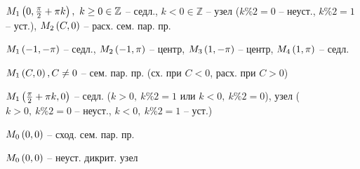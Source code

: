 \begin{enumsols}
		\label{sol:stability_points:types_general}
		\item \( M_1 \left( 0, \frac{\pi}{2} + \pi k \right), ~ k \ge 0 \in \mathbb{Z} \) -- седл., \( k < 0 \in \mathbb{Z} \) -- узел ($k \% 2 = 0$ -- неуст., $k \% 2 = 1$ -- уст.), \( M_2 \left( C, 0 \right) \) -- расх. сем. пар. пр. %
		\item \( M_1 \left( -1, -\pi \right) \) -- седл., \( M_2 \left( -1, \pi \right) \) -- центр, \( M_3 \left( 1, -\pi \right) \) -- центр, \( M_4 \left( 1, \pi \right) \) -- седл. %
		\item \( M_1 \left( C, 0 \right), C \neq 0 \) -- сем. пар. пр. (сх. при $C < 0$, расх. при $C > 0$) %
		\item \( M_1 \left( \frac{\pi}{2} + \pi k, 0 \right) \) -- седл. ($k > 0, ~ k \% 2 = 1$ или $k < 0, ~ k \% 2 = 0$), узел ($k > 0, ~ k \% 2 = 0$ -- неуст., $k < 0, ~ k \% 2 = 1$ -- уст.) %
		\item \( M_0 \left( 0, 0 \right) \) -- сход. сем. пар. пр. %
		\item \( M_0 \left( 0, 0 \right) \) -- неуст. дикрит. узел %
		

\end{enumsols}
